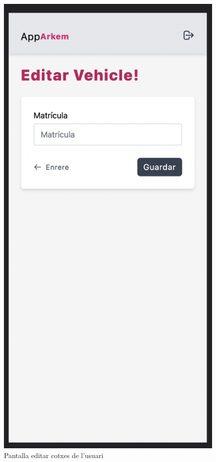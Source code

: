 \begin{figure}[H]
    \begin{center}
        \includegraphics[scale=0.50]{Fotos/pantalla10_edit_car.png}
    \end{center}
    \caption{Pantalla editar cotxes de l'usuari}
    \label{fig:edit_car_photo}
\end{figure}

